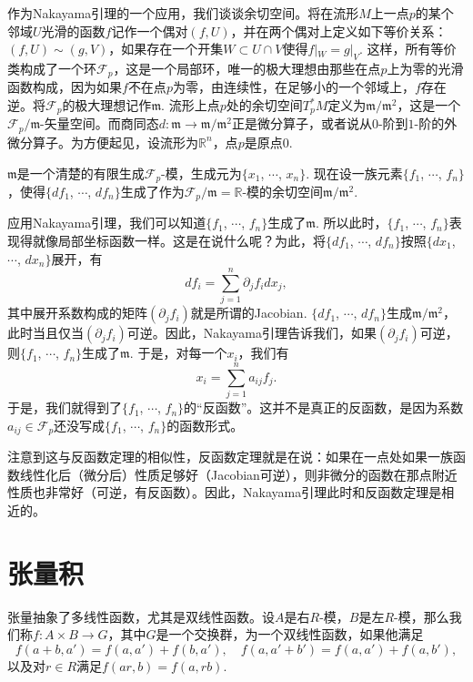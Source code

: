 \para 作为Nakayama引理的一个应用，我们谈谈余切空间。将在流形$M$上一点$p$的某个邻域$U$光滑的函数$f$记作一个偶对$(f,U)$，并在两个偶对上定义如下等价关系：$(f,U)\sim (g,V)$，如果存在一个开集$W\subset U\cap V$使得$f|_W=g|_V$. 这样，所有等价类构成了一个环$\mathcal{F}_p$，这是一个局部环，唯一的极大理想由那些在点$p$上为零的光滑函数构成，因为如果$f$不在点$p$为零，由连续性，在足够小的一个邻域上，$f$存在逆。将$\mathcal{F}_p$的极大理想记作$\mathfrak{m}$. 流形上点$p$处的余切空间$T_p^*M$定义为$\mathfrak{m}/\mathfrak{m}^2$，这是一个$\mathcal{F}_p/\mathfrak{m}$-矢量空间。而商同态$d:\mathfrak{m}\to \mathfrak{m}/\mathfrak{m}^2$正是微分算子，或者说从$0$-阶到$1$-阶的外微分算子。为方便起见，设流形为$\mathbb{R}^n$，点$p$是原点$0$.

$\mathfrak{m}$是一个清楚的有限生成$\mathcal{F}_p$-模，生成元为$\{x_1$, $\cdots$, $x_n\}$. 现在设一族元素$\{f_1$, $\cdots$, $f_n\}$，使得$\{df_1$, $\cdots$, $df_n\}$生成了作为$\mathcal{F}_p/\mathfrak{m}=\mathbb{R}$-模的余切空间$\mathfrak{m}/\mathfrak{m}^2$.

应用Nakayama引理，我们可以知道$\{f_1$, $\cdots$, $f_n\}$生成了$\mathfrak{m}$. 所以此时，$\{f_1$, $\cdots$, $f_n\}$表现得就像局部坐标函数一样。这是在说什么呢？为此，将$\{df_1$, $\cdots$, $df_n\}$按照$\{dx_1$, $\cdots$, $dx_n\}$展开，有
\[
	df_i=\sum_{j=1}^n\partial_jf_i dx_j,
\]
其中展开系数构成的矩阵$(\partial_jf_i)$就是所谓的Jacobian. $\{df_1$, $\cdots$, $df_n\}$生成$\mathfrak{m}/\mathfrak{m}^2$，此时当且仅当$(\partial_jf_i)$可逆。因此，Nakayama引理告诉我们，如果$(\partial_jf_i)$可逆，则$\{f_1$, $\cdots$, $f_n\}$生成了$\mathfrak{m}$. 于是，对每一个$x_i$，我们有
\[
	x_i=\sum_{j=1}^n a_{ij}f_j.
\]
于是，我们就得到了$\{f_1$, $\cdots$, $f_n\}$的“反函数”。这并不是真正的反函数，是因为系数$a_{ij}\in \mathcal{F}_p$还没写成$\{f_1$, $\cdots$, $f_n\}$的函数形式。

注意到这与反函数定理的相似性，反函数定理就是在说：如果在一点处如果一族函数线性化后（微分后）性质足够好（Jacobian可逆），则非微分的函数在那点附近性质也非常好（可逆，有反函数）。因此，Nakayama引理此时和反函数定理是相近的。

\section{张量积}

\para 张量抽象了多线性函数，尤其是双线性函数。设$A$是右$R$-模，$B$是左$R$-模，那么我们称$f:A\times B\to G$，其中$G$是一个交换群，为一个双线性函数，如果他满足
\[
	f(a+b,a')=f(a,a')+f(b,a'),\quad f(a,a'+b')=f(a,a')+f(a,b'),
\]
以及对$r\in R$满足$f(ar,b)=f(a,rb)$.


